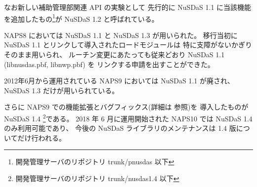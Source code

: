 なお新しい補助管理部関連 API の実験として
先行的に NuSDaS 1.1 に当該機能を追加したもの\footnote{
	 開発管理サーバのリポジトリ trunk/pnusdas 以下
}が NuSDaS 1.2 と呼ばれている。

NAPS8 においては NuSDaS 1.1 と NuSDaS 1.3 が用いられた。
移行当初に NuSDaS 1.1 とリンクして導入されたロードモジュールは
特に支障がないかぎりそのまま用いられ、
ルーチン変更にあたっても従来どおり NuSDaS 1.1 (libnusdas.pbf, libnwp.pbf) を
リンクする申請を出すことができた。

2012年6月から運用されている NAPS9 においては NuSDaS 1.1 が廃され、
NuSDaS 1.3 だけが用いられている。

さらに NAPS9 での機能拡張とバグフィックス(詳細は  参照)を
導入したものが NuSDaS 1.4 \footnote{
	開発管理サーバのリポジトリ trunk/nusdas1.4 以下
}である。
2018 年 6 月に運用開始された NAPS10 では NuSDaS 1.4 のみ利用可能であり、
今後の NuSDaS ライブラリのメンテナンスは 1.4 版についてだけ行われる。
